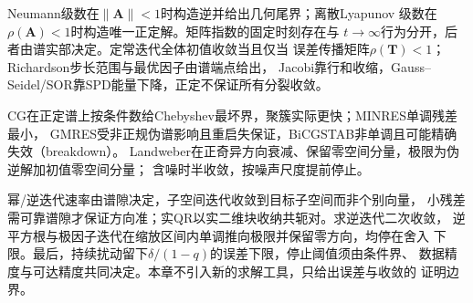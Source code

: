 Neumann级数在$\lVert\bm A\rVert<1$时构造逆并给出几何尾界；离散Lyapunov
级数在$\rho(\bm A)<1$时构造唯一正定解。矩阵指数的固定时刻存在与
$t\to\infty$行为分开，后者由谱实部决定。定常迭代全体初值收敛当且仅当
误差传播矩阵$\rho(\bm T)<1$；Richardson步长范围与最优因子由谱端点给出，
Jacobi靠行和收缩，Gauss--Seidel/SOR靠SPD能量下降，正定不保证所有分裂收敛。

CG在正定谱上按条件数给Chebyshev最坏界，聚簇实际更快；MINRES单调残差最小，
GMRES受非正规伪谱影响且重启失保证，BiCGSTAB非单调且可能精确失效（breakdown）。
Landweber在正奇异方向衰减、保留零空间分量，极限为伪逆解加初值零空间分量；
含噪时半收敛，按噪声尺度提前停止。

幂/逆迭代速率由谱隙决定，子空间迭代收敛到目标子空间而非个别向量，
小残差需可靠谱隙才保证方向准；实QR以实二维块收纳共轭对。求逆迭代二次收敛，
逆平方根与极因子迭代在缩放区间内单调推向极限并保留零方向，均停在舍入
下限。最后，持续扰动留下$\delta/(1-q)$的误差下限，停止阈值须由条件界、
数据精度与可达精度共同决定。本章不引入新的求解工具，只给出误差与收敛的
证明边界。
